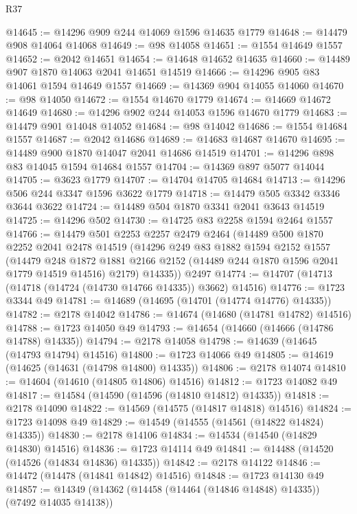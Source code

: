 \begin{lexlean}{R37}
\begin{coremodule}
@14645 := @14296 @909 @244 @14069 @1596 @14635 @1779
@14648 := @14479 @908 @14064 @14068
@14649 := @98 @14058
@14651 := @1554 @14649 @1557
@14652 := @2042 @14651
@14654 := @14648 @14652 @14635
@14660 := @14489 @907 @1870 @14063 @2041 @14651 @14519
@14666 := @14296 @905 @83 @14061 @1594 @14649 @1557
@14669 := @14369 @904 @14055 @14060
@14670 := @98 @14050
@14672 := @1554 @14670 @1779
@14674 := @14669 @14672 @14649
@14680 := @14296 @902 @244 @14053 @1596 @14670 @1779
@14683 := @14479 @901 @14048 @14052
@14684 := @98 @14042
@14686 := @1554 @14684 @1557
@14687 := @2042 @14686
@14689 := @14683 @14687 @14670
@14695 := @14489 @900 @1870 @14047 @2041 @14686 @14519
@14701 := @14296 @898 @83 @14045 @1594 @14684 @1557
@14704 := @14369 @897 @5077 @14044
@14705 := @3623 @1779
@14707 := @14704 @14705 @14684
@14713 := @14296 @506 @244 @3347 @1596 @3622 @1779
@14718 := @14479 @505 @3342 @3346 @3644 @3622
@14724 := @14489 @504 @1870 @3341 @2041 @3643 @14519
@14725 := @14296 @502
@14730 := @14725 @83 @2258 @1594 @2464 @1557
@14766 := @14479
    @501
    @2253
    @2257
    @2479
    @2464
    (@14489
      @500
      @1870
      @2252
      @2041
      @2478
      @14519
      (@14296
        @249
        @83
        @1882
        @1594
        @2152
        @1557
        (@14479
          @248
          @1872
          @1881
          @2166
          @2152
          (@14489 @244 @1870 @1596 @2041 @1779 @14519 @14516)
          @2179)
        @14335))
    @2497
@14774 := @14707 (@14713 (@14718 (@14724 (@14730 @14766 @14335)) @3662) @14516)
@14776 := @1723 @3344 @49
@14781 := @14689 (@14695 (@14701 (@14774 @14776) @14335))
@14782 := @2178 @14042
@14786 := @14674 (@14680 (@14781 @14782) @14516)
@14788 := @1723 @14050 @49
@14793 := @14654 (@14660 (@14666 (@14786 @14788) @14335))
@14794 := @2178 @14058
@14798 := @14639 (@14645 (@14793 @14794) @14516)
@14800 := @1723 @14066 @49
@14805 := @14619 (@14625 (@14631 (@14798 @14800) @14335))
@14806 := @2178 @14074
@14810 := @14604 (@14610 (@14805 @14806) @14516)
@14812 := @1723 @14082 @49
@14817 := @14584 (@14590 (@14596 (@14810 @14812) @14335))
@14818 := @2178 @14090
@14822 := @14569 (@14575 (@14817 @14818) @14516)
@14824 := @1723 @14098 @49
@14829 := @14549 (@14555 (@14561 (@14822 @14824) @14335))
@14830 := @2178 @14106
@14834 := @14534 (@14540 (@14829 @14830) @14516)
@14836 := @1723 @14114 @49
@14841 := @14488 (@14520 (@14526 (@14834 @14836) @14335))
@14842 := @2178 @14122
@14846 := @14472 (@14478 (@14841 @14842) @14516)
@14848 := @1723 @14130 @49
@14857 := @14349 (@14362 (@14458 (@14464 (@14846 @14848) @14335)) (@7492 @14035 @14138))

\end{coremodule}
\end{lexlean}
